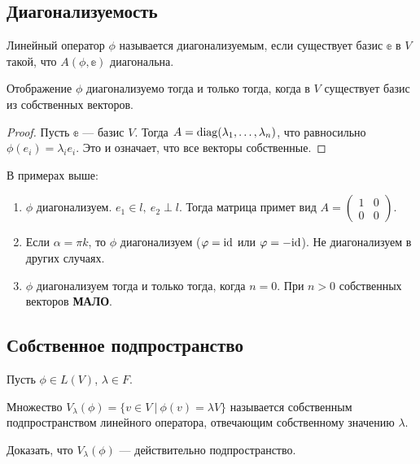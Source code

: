\subsection*{Диагонализуемость}
\begin{Def}
    Линейный оператор $\phi$ называется диагонализуемым, если существует базис $\mathbb{e}$ в $V$ такой, что $A(\phi, \mathbb{e})$ диагональна. 
\end{Def}
\begin{Suggestion}
    Отображение $\phi$ диагонализуемо тогда и только тогда, когда в $V$ существует базис из собственных векторов.
\end{Suggestion}

\begin{proof}
    Пусть $\mathbb{e}$ --- базис $V$. Тогда $A = \mathrm{diag}(\lambda_1, \ldots, \lambda_n)$, что равносильно $\phi(e_i) = \lambda_i e_i$. Это и означает, что все векторы собственные.
\end{proof}
В примерах выше:
\begin{enumerate}
    \item $\phi$ диагонализуем. $e_1 \in l,\ e_2 \perp l$. Тогда матрица примет вид $A = \begin{pmatrix}
        1 &0 \\
        0 &0
    \end{pmatrix}$.
    \item Если $\alpha = \pi k$, то $\phi$ диагонализуем ($\varphi = \mathrm{id}$ или $\varphi = - \mathrm{id}$). Не диагонализуем в других случаях.
    \item $\phi$ диагонализуем тогда и только тогда, когда $n = 0$. При $n > 0$ собственных векторов \textbf{МАЛО}.
\end{enumerate}

\subsection*{Собственное подпространство}
Пусть $\phi\in L(V)$, $\lambda\in F$. 

\begin{Def}
    Множество $V_{\lambda}(\phi) = \{v\in V\ |\ \phi(v) = \lambda V\}$ называется собственным подпространством линейного оператора, отвечающим собственному значению $\lambda$.
\end{Def}

\begin{Task}
Доказать, что $V_\lambda(\phi)$ --- действительно подпространство.
\end{Task}

